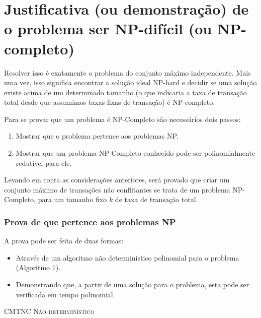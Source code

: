 \documentclass[conference]{IEEEtran}
\begin{document}
\section{Justificativa (ou demonstração) de o problema ser NP-difícil (ou NP-completo)}

Resolver isso é exatamente o problema do conjunto máximo independente. Mais uma vez, isso significa encontrar a solução ideal NP-hard e decidir se uma solução existe acima de um determinado tamanho (o que indicaria a taxa de transação total desde que assumimos taxas fixas de transação) é NP-completo.

Para se provar que um problema é NP-Completo são necessários dois passos:

\begin{enumerate}
    \item Mostrar que o problema pertence aos problemas NP.
    \item Mostrar que um problema NP-Completo conhecido pode ser polinomialmente redutível para ele.
\end{enumerate}

Levando em conta as considerações anteriores, será provado que criar um conjunto máximo de transações não conflitantes se trata de um problema NP-Completo, para um tamanho fixo $k$ de taxa de transação total.

\subsubsection{Prova de que pertence aos problemas NP}

A prova pode ser feita de duas formas:

\begin{itemize}
    \item Através de um algoritmo não determinístico polinomial para o problema (Algoritmo 1).
    \item Demonstrando que, a partir de uma solução para o problema, esta pode ser verificada em tempo polinomial.
\end{itemize}

\begin{algorithm}[htbp!]
\SetAlgoLined
{}
\label{alg:conjunto-maximo-transacoes-nao-deterministico}
\caption{\textsc{CMTNC Não determinístico}}
\end{algorithm}
\end{document}

